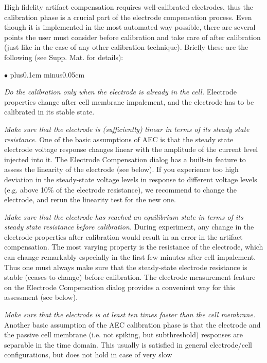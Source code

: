 \documentclass{article}
\newenvironment{myitem}{\begin{list}{$\bullet$}{\setlength{\leftmargin}{1.1em}
\itemsep0.1cm plus0.1cm minus0.05cm
\listparindent0cm
\addtolength{\labelsep}{0.5\labelsep}
\setlength{\labelwidth}{0.8em}
\setlength{\leftmargin}{\labelwidth}
\addtolength{\leftmargin}{\labelsep}
}}{\end{list}}
\begin{document}
High fidelity artifact compensation requires well-calibrated
electrodes, thus the calibration phase is a crucial part of the electrode
compensation process. Even though it is implemented in the most automated
way possible, there are several points the user must consider before
calibration and take care of after calibration (just like in the case of any other
calibration technique). Briefly these are the
following (see \cite{Brette2008} Supp. Mat. for details): 
\begin{myitem}
\item \emph{Do the calibration only when the electrode is already in the
  cell.} Electrode properties change after cell membrane impalement, and
  the electrode has to be calibrated in its stable state.
\item \emph{Make sure that the electrode is (sufficiently) linear in terms
  of its steady state resistance.} One of 
  the basic assumptions of AEC is that the steady state electrode voltage
  response changes linear with the amplitude of the current level injected
  into it. The Electrode Compensation dialog has a built-in feature to
  assess the linearity of the electrode (see below). If you experience too
  high deviation in the steady-state voltage levels in response to
  different voltage levels (e.g. above 10\% of the electrode resistance),
  we recommend to change the electrode, and rerun the linearity test for
  the new one.
\item \emph{Make sure that the electrode has reached an equilibrium state
  in terms of its steady state resistance before calibration.} During
  experiment, any change in the electrode properties after calibration
  would result in an error in the artifact compensation. The most varying
  property is the resistance of the electrode, which can change remarkably
  especially in the first few minutes after cell
  impalement. Thus one must always make sure that the steady-state
  electrode resistance is stable (ceases to change) before calibration. The
  electrode measurement feature on the Electrode Compensation dialog
  provides a convenient way for this assessment (see below).  
\item \emph{Make sure that the electrode is at least ten times faster than
  the cell membrane.} Another basic assumption of the AEC calibration phase
  is that the electrode and the passive cell membrane (i.e. not spiking, but
  subthreshold) responses are separable in the time domain. This
  usually is satisfied in general
  electrode/cell configurations, but does not hold in case of very slow

\end{myitem}
\end{document}

